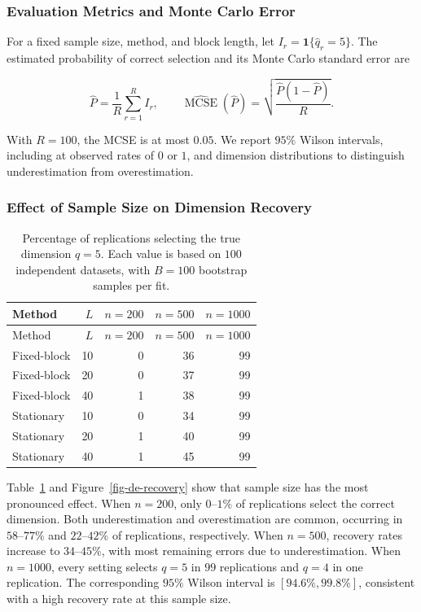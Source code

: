 \documentclass[
  english,
  11pt,
  a4paper,
]{article}
\begin{document}
\subsubsection{Evaluation Metrics and Monte Carlo
Error}\label{evaluation-metrics-and-monte-carlo-error}

For a fixed sample size, method, and block length, let
\(I_r=\mathbf 1\{\widehat q_r=5\}\). The estimated probability of
correct selection and its Monte Carlo standard error are

\[
\widehat P=\frac{1}{R}\sum_{r=1}^{R}I_r,
\qquad
\widehat{\operatorname{MCSE}}(\widehat P)
=\sqrt{\frac{\widehat P(1-\widehat P)}{R}}.
\]

With \(R=100\), the MCSE is at most \(0.05\). We report \(95\%\) Wilson
intervals, including at observed rates of \(0\) or \(1\), and dimension
distributions to distinguish underestimation from overestimation.

\subsubsection{Effect of Sample Size on Dimension
Recovery}\label{effect-of-sample-size-on-dimension-recovery}

\begin{longtable}[]{@{}lrrrr@{}}
\caption{Percentage of replications selecting the true dimension
\(q=5\). Each value is based on \(100\) independent datasets, with
\(B=100\) bootstrap samples per
fit.}\label{tbl-de-recovery}\tabularnewline
\toprule\noalign{}
Method & \(L\) & \(n=200\) & \(n=500\) & \(n=1000\) \\
\midrule\noalign{}
\endfirsthead
\toprule\noalign{}
Method & \(L\) & \(n=200\) & \(n=500\) & \(n=1000\) \\
\midrule\noalign{}
\endhead
\bottomrule\noalign{}
\endlastfoot
Fixed-block & 10 & 0 & 36 & 99 \\
Fixed-block & 20 & 0 & 37 & 99 \\
Fixed-block & 40 & 1 & 38 & 99 \\
Stationary & 10 & 0 & 34 & 99 \\
Stationary & 20 & 1 & 40 & 99 \\
Stationary & 40 & 1 & 45 & 99 \\
\end{longtable}

Table~\ref{tbl-de-recovery} and Figure~\ref{fig-de-recovery} show that
sample size has the most pronounced effect. When \(n=200\), only
\(0\)--\(1\%\) of replications select the correct dimension. Both
underestimation and overestimation are common, occurring in
\(58\)--\(77\%\) and \(22\)--\(42\%\) of replications, respectively.
When \(n=500\), recovery rates increase to \(34\)--\(45\%\), with most
remaining errors due to underestimation. When \(n=1000\), every setting
selects \(q=5\) in \(99\) replications and \(q=4\) in one replication.
The corresponding \(95\%\) Wilson interval is \([94.6\%,99.8\%]\),
consistent with a high recovery rate at this sample size.
\end{document}
